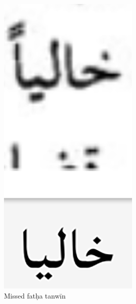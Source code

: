  \begin{figure}[h]
	\includegraphics[width=\linewidth]{images/image3.png}
	\caption{Missed fatḥa tanwīn}
  	\label{fig:fig16}
\end{figure}
 
